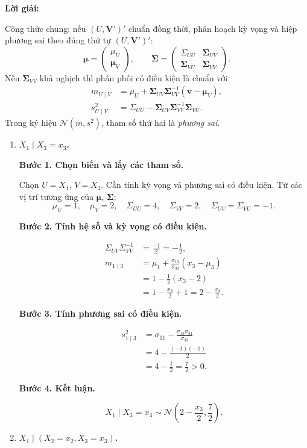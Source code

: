 \documentclass[11pt,a4paper]{article}
\renewcommand{\boldsymbol}[1]{\symbf{#1}}
\newenvironment{solution}{%
  \par\medskip\noindent\textbf{Lời giải:}\par\nopagebreak[4]\smallskip\noindent\ignorespaces
}{\par}
\newcommand{\answer}[1]{\boxed{#1}}
\newcommand{\step}[2]{\par\medskip\noindent\textbf{Bước #1. #2}\par\nopagebreak[4]\smallskip\noindent}
\begin{document}
\begin{solution}
Công thức chung: nếu $(U,\mathbf{V}')'$ chuẩn đồng thời, phân hoạch
kỳ vọng và hiệp phương sai theo đúng thứ tự $(U,\mathbf{V}')'$:
\[
\boldsymbol{\mu}=\begin{pmatrix}\mu_U\\\boldsymbol{\mu}_V\end{pmatrix},\qquad
\boldsymbol{\Sigma}=\begin{pmatrix}
\Sigma_{UU}&\boldsymbol{\Sigma}_{UV}\\
\boldsymbol{\Sigma}_{VU}&\boldsymbol{\Sigma}_{VV}
\end{pmatrix}.
\]
Nếu $\boldsymbol{\Sigma}_{VV}$ khả nghịch thì phân phối có điều kiện là chuẩn với
\begin{align*}
m_{U\mid V}&=\mu_U+\boldsymbol{\Sigma}_{UV}
 \boldsymbol{\Sigma}_{VV}^{-1}(\mathbf{v}-\boldsymbol{\mu}_V),\\
s^2_{U\mid V}&=\Sigma_{UU}-\boldsymbol{\Sigma}_{UV}
 \boldsymbol{\Sigma}_{VV}^{-1}\boldsymbol{\Sigma}_{VU}.
\end{align*}
Trong ký hiệu $\mathcal{N}(m,s^2)$, tham số thứ hai là \emph{phương sai}.
\begin{enumerate}[label=\textbf{\alph*)}]
\item \textbf{$X_1\mid X_3=x_3$.}\par\nopagebreak[4]
\step{1}{Chọn biến và lấy các tham số.}
Chọn $U=X_1$, $V=X_3$. Cần tính kỳ vọng và phương sai có điều kiện.
Từ các vị trí tương ứng của $\boldsymbol{\mu}$, $\boldsymbol{\Sigma}$:
\[
\mu_U=1,\quad\mu_V=2,\quad
\Sigma_{UU}=4,\quad\Sigma_{VV}=2,\quad\Sigma_{UV}=\Sigma_{VU}=-1.
\]
\step{2}{Tính hệ số và kỳ vọng có điều kiện.}
\begin{align*}
\Sigma_{UV}\Sigma_{VV}^{-1}&=\frac{-1}{2}=-\frac12,\\
m_{1\mid3}&=\mu_1+\frac{\sigma_{13}}{\sigma_{33}}(x_3-\mu_3)\\
&=1-\frac12(x_3-2)\\
&=1-\frac{x_3}{2}+1=2-\frac{x_3}{2}.
\end{align*}
\step{3}{Tính phương sai có điều kiện.}
\begin{align*}
s^2_{1\mid3}&=\sigma_{11}-\frac{\sigma_{13}\sigma_{31}}{\sigma_{33}}\\
&=4-\frac{(-1)(-1)}{2}\\
&=4-\frac12=\frac72>0.
\end{align*}
\step{4}{Kết luận.}
\[
X_1\mid X_3=x_3\sim\answer{\mathcal{N}\left(2-\frac{x_3}{2},\frac72\right)}.
\]
\item \textbf{$X_1\mid(X_2=x_2,X_3=x_3)$.}\par\nopagebreak[4]

\end{enumerate}
\end{solution}
\end{document}

